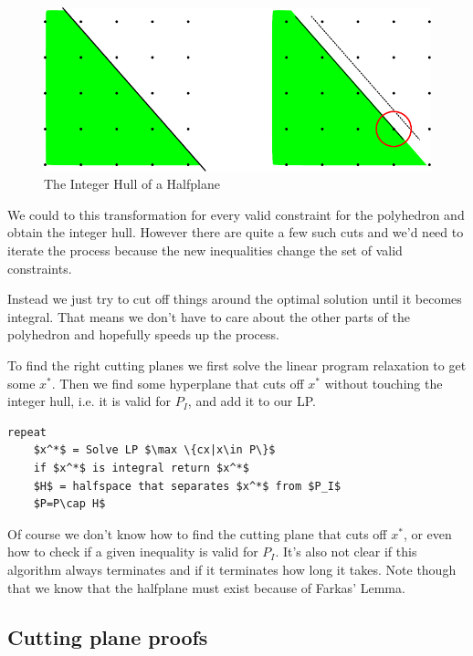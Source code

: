 \begin{figure}[hbt]
\begin{center}
\includegraphics{./images/roundDownCuttingPlane}
\end{center}
\caption{The Integer Hull of a Halfplane}
\end{figure}

We could to this transformation for every valid constraint for the polyhedron and obtain the integer hull. However there are quite a few such cuts and we'd need to iterate the process because the new inequalities change the set of valid constraints.

Instead we just try to cut off things around the optimal solution until it becomes integral. That means we don't have to care about the other parts of the polyhedron and hopefully speeds up the process.

To find the right cutting planes we first solve the linear program relaxation to get some $x^*$. Then we find some hyperplane that cuts off $x^*$ without touching the integer hull, i.e. it is valid for $P_I$, and add it to our LP.

\begin{lstlisting}
repeat
	$x^*$ = Solve LP $\max \{cx|x\in P\}$
	if $x^*$ is integral return $x^*$
	$H$ = halfspace that separates $x^*$ from $P_I$
	$P=P\cap H$
\end{lstlisting}

Of course we don't know how to find the cutting plane that cuts off $x^*$, or even how to check if a given inequality is valid for $P_I$. It's also not clear if this algorithm always terminates and if it terminates how long it takes. Note though that we know that the halfplane must exist because of Farkas' Lemma.

\subsection{Cutting plane proofs}

